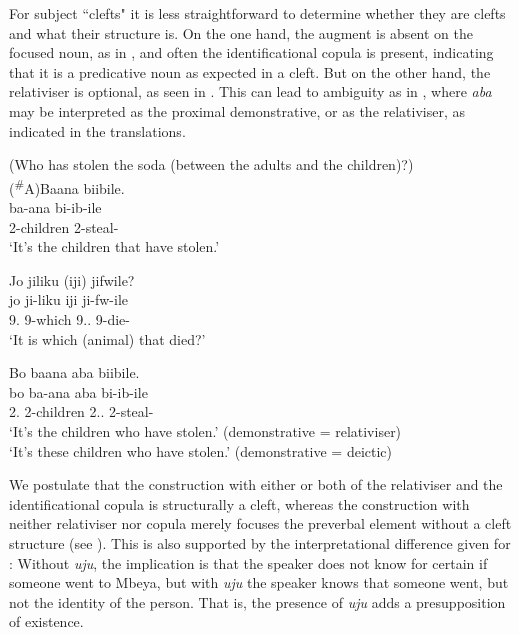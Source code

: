 \documentclass[output=paper]{langscibook}
\begin{document}
\z

For subject ``clefts" it is less straightforward to determine whether they are clefts and what their structure is. On the one hand, the augment is absent on the focused noun, as in , and often the identificational copula is present, indicating that it is a predicative noun as expected in a cleft. But on the other hand, the relativiser is optional, as seen in . This can lead to ambiguity as in , where \textit{aba} may be interpreted as the proximal demonstrative, or as the relativiser, as indicated in the translations.

\ea
\label{bkm:Ref136505713}
(Who has stolen the soda (between the adults and the children)?)\\
(\textsuperscript{\#}A)Baana biibile.\\
\gll
ba-ana  bi-ib-ile\\
2-children  2\SM{}-steal-\PFV{}\\
\glt
‘It’s the children that have stolen.’\\

\z


\ea
\label{bkm:Ref98081490}
Jo jiliku (iji) jifwile?\\
\gll
jo  ji-liku  iji  ji-fw-ile\\
9.\IDCOP{}  9-which  9.\DEM.\PROX{}  9\SM{}-die-\PFV{}\\
\glt
‘It is which (animal) that died?’\\

\z


\ea
\label{bkm:Ref98081471}
Bo baana aba biibile.\\
\gll
bo  ba-ana  aba  bi-ib-ile\\
2.\IDCOP{}  2-children  2.\DEM.\PROX{}  2\SM{}-steal-\PFV{}\\
\glt
‘It’s the children who have stolen.’ (demonstrative = relativiser)\\

‘It’s these children who have stolen.’ (demonstrative = deictic)\\
\z

We postulate that the construction with either or both of the relativiser and the identificational copula is structurally a cleft, whereas the construction with neither relativiser nor copula merely focuses the preverbal element without a cleft structure (see ). This is also supported by the interpretational difference given for : Without \textit{uju}, the implication is that the speaker does not know for certain if someone went to Mbeya, but with \textit{uju} the speaker knows that someone went, but not the identity of the person. That is, the presence of \textit{uju} adds a presupposition of existence.
\end{document}
